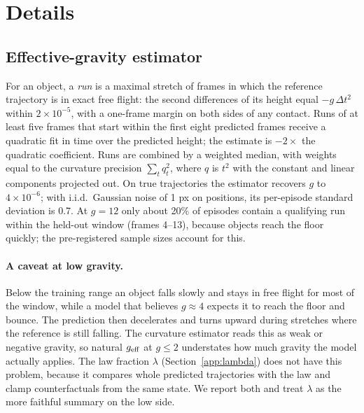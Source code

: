 \section{Details}
\label{app:details}

\subsection{Effective-gravity estimator}
For an object, a \emph{run} is a maximal stretch of frames in which the reference trajectory is in
exact free flight: the second differences of its height equal $-g\,\Delta t^2$ within $2\times10^{-5}$,
with a one-frame margin on both sides of any contact. Runs of at least five frames that start within
the first eight predicted frames receive a quadratic fit in time over the predicted height; the
estimate is $-2\times$ the quadratic coefficient. Runs are combined by a weighted median, with weights
equal to the curvature precision $\sum_t q_t^2$, where $q$ is $t^2$ with the constant and linear
components projected out. On true trajectories the estimator recovers $g$ to $4\times10^{-6}$; with
i.i.d.\ Gaussian noise of 1 px on positions, its per-episode standard deviation is 0.7. At $g=12$ only
about 20\% of episodes contain a qualifying run within the held-out window (frames 4--13), because
objects reach the floor quickly; the pre-registered sample sizes account for this.

\paragraph{A caveat at low gravity.} Below the training range an object falls slowly and stays in
free flight for most of the window, while a model that believes $g\approx4$ expects it to reach the
floor and bounce. The prediction then decelerates and turns upward during stretches where the
reference is still falling. The curvature estimator reads this as weak or negative gravity, so
natural $g_{\rm eff}$ at $g\le 2$ understates how much gravity the model actually applies. The law
fraction $\lambda$ (Section~\ref{app:lambda}) does not have this problem, because it compares whole
predicted trajectories with the law and clamp counterfactuals from the same state. We report both and
treat $\lambda$ as the more faithful summary on the low side.

